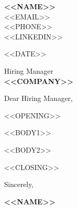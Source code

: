 \documentclass[letterpaper,11pt]{article}
\begin{document}
\begin{flushright}
  \textbf{<<NAME>>} \\
  <<EMAIL>> \\
  <<PHONE>> \\
  <<LINKEDIN>>
\end{flushright}

\vspace{12pt}

<<DATE>>

\vspace{12pt}

Hiring Manager \\
\textbf{<<COMPANY>>} \\

\vspace{12pt}

Dear Hiring Manager,

\vspace{8pt}

<<OPENING>>

\vspace{8pt}

<<BODY1>>

\vspace{8pt}

<<BODY2>>

\vspace{8pt}

<<CLOSING>>

\vspace{16pt}

Sincerely,

\vspace{24pt}

\textbf{<<NAME>>}
\end{document}
